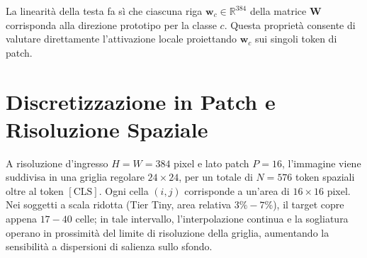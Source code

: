 La linearità della testa fa sì che ciascuna riga $\mathbf{w}_c \in \mathbb{R}^{384}$ della matrice $\mathbf{W}$ corrisponda alla direzione prototipo per la classe $c$. Questa proprietà consente di valutare direttamente l'attivazione locale proiettando $\mathbf{w}_c$ sui singoli token di patch.

\section{Discretizzazione in Patch e Risoluzione Spaziale}
\label{sec:arch_risoluzione}
A risoluzione d'ingresso $H = W = 384$ pixel e lato patch $P = 16$, l'immagine viene suddivisa in una griglia regolare $24 \times 24$, per un totale di $N = 576$ token spaziali oltre al token $[\text{CLS}]$. Ogni cella $(i, j)$ corrisponde a un'area di $16 \times 16$ pixel.
Nei soggetti a scala ridotta (Tier Tiny, area relativa $3\% - 7\%$), il target copre appena $17-40$ celle; in tale intervallo, l'interpolazione continua e la sogliatura operano in prossimità del limite di risoluzione della griglia, aumentando la sensibilità a dispersioni di salienza sullo sfondo.

